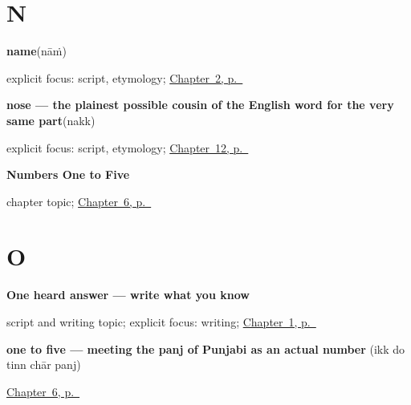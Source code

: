 \section*{N}

\noindent\begin{minipage}[t]{\linewidth}
\raggedright
\textbf{name}\enspace\emph{}\enspace(nāṁ)\par
\footnotesize explicit focus: script, etymology; \hyperref[ch:introductions]{Chapter~2, p.~\pageref*{ch:introductions}}
\end{minipage}\par\smallskip

\noindent\begin{minipage}[t]{\linewidth}
\raggedright
\textbf{nose — the plainest possible cousin of the English word for the very same part}\enspace\emph{}\enspace(nakk)\par
\footnotesize explicit focus: script, etymology; \hyperref[ch:pa-face-parts]{Chapter~12, p.~\pageref*{ch:pa-face-parts}}
\end{minipage}\par\smallskip

\noindent\begin{minipage}[t]{\linewidth}
\raggedright
\textbf{Numbers One to Five}\par
\footnotesize chapter topic; \hyperref[ch:numbers-one-to-five]{Chapter~6, p.~\pageref*{ch:numbers-one-to-five}}
\end{minipage}\par\smallskip

\section*{O}

\noindent\begin{minipage}[t]{\linewidth}
\raggedright
\textbf{One heard answer — write what you know}\par
\footnotesize script and writing topic; explicit focus: writing; \hyperref[ch:greetings]{Chapter~1, p.~\pageref*{ch:greetings}}
\end{minipage}\par\smallskip

\noindent\begin{minipage}[t]{\linewidth}
\raggedright
\textbf{one to five — meeting the panj of Punjabi as an actual number}\enspace\emph{    }\enspace(ikk do tinn chār panj)\par
\footnotesize \hyperref[ch:numbers-one-to-five]{Chapter~6, p.~\pageref*{ch:numbers-one-to-five}}
\end{minipage}\par\smallskip

